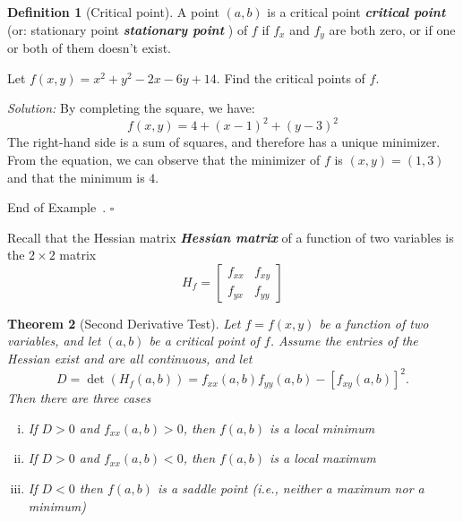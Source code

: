 \documentclass[10pt]{article}
\DeclareRobustCommand{\demph}[1]{%
  \ifmmode
  {\color{Blue}#1}%
  \else
  {\color{Blue}\bfseries\slshape #1}%
  \fi
}
\newtheorem{theorem}{Theorem}
\newtheorem{remark}[theorem]{Remark}
\theoremstyle{definition}
\newtheorem{definition}[theorem]{Definition}
\newtheorem{example}[theorem]{Example}
\renewenvironment{example}
{\begin{oldexample}}
  {\par\smallskip\hfill   End of Example~\theexample. $\square$    \par\end{oldexample}}
\renewenvironment{remark}
{\begin{oldremark}} 
  {\par\smallskip\hfill   End of Remark~\theremark. $\square$    \par\end{oldremark}}
\newcommand{\1}[1]{\textbf{1}_{\left[#1\right]}} %
\begin{document}
\begin{definition}[Critical point]
  \label{def:critical-point}
  A point $(a,b)$ is a \demph{critical point} (or: \demph{stationary point}) of
  $f$ if $f_{x}$ and $f_{y}$ are both zero, or if one or both of them doesn't
  exist.
\end{definition}

\begin{example}
  Let $f(x,y) = x^{2}+y^{2}-2x-6y+14$. Find the critical points of $f$.

  \textit{Solution:} By completing the square, we have:
  \begin{equation*}
    f(x,y) = 4+(x-1)^{2}+(y-3)^{2}
  \end{equation*}
  The right-hand side is a sum of squares, and therefore has a unique
  minimizer. From the equation, we can observe that the minimizer of $f$ is
  $(x,y) =(1,3)$ and that the minimum is $4$. 
\end{example}

Recall that the \demph{Hessian matrix} of a function of two variables is the $2\times 2$
matrix
\begin{equation*}
  H_{f} = \begin{bmatrix}
    f_{xx}&f_{xy}\\
    f_{yx}&f_{yy}
  \end{bmatrix}
\end{equation*}


\begin{theorem}[Second Derivative Test]
  \label{thm:second-derivative-test}
  Let $f=f(x,y)$ be a function of two variables, and let $(a,b)$ be a
  critical point of $f$. Assume the entries of the Hessian exist and are all
  continuous, and let
  \begin{equation*}
    D = \det(H_{f}(a,b)) = f_{xx}(a,b)f_{yy}(a,b)- \left[ f_{xy}(a,b) \right]^{2}. 
  \end{equation*}
  Then there are three cases
  \begin{enumerate}[(i)]
    \item If $D>0$ and $f_{xx}(a,b)>0$, then $f(a,b)$ is a local minimum
    \item If $D>0$ and $f_{xx}(a,b)<0$, then $f(a,b)$ is a local maximum
    \item If $D<0$ then $f(a,b)$ is a saddle point (i.e., neither a maximum
    nor a minimum)
  \end{enumerate}
\end{theorem}

\end{document}
